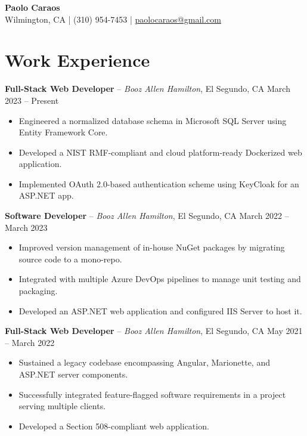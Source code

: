 \documentclass[10pt,letterpaper]{article}
\begin{document}
\begin{center}
    {\Large \bfseries Paolo Caraos} \\ \vspace{2pt}
    {\small Wilmington, CA | (310) 954-7453 | \href{mailto:paolocaraos@gmail.com}{paolocaraos@gmail.com}}
\end{center}


\section{Work Experience}

\noindent
\textbf{Full-Stack Web Developer} -- \textit{Booz Allen Hamilton}, El Segundo, CA \hfill March 2023 -- Present
\begin{itemize}
    \item Engineered a normalized database schema in Microsoft SQL Server using Entity Framework Core.
    \item Developed a NIST RMF-compliant and cloud platform-ready Dockerized web application.
    \item Implemented OAuth 2.0-based authentication scheme using KeyCloak for an ASP.NET app.
\end{itemize}

\vspace{6pt}

\noindent
\textbf{Software Developer} -- \textit{Booz Allen Hamilton}, El Segundo, CA \hfill March 2022 -- March 2023
\begin{itemize}
    \item Improved version management of in-house NuGet packages by migrating source code to a mono-repo.
    \item Integrated with multiple Azure DevOps pipelines to manage unit testing and packaging.
    \item Developed an ASP.NET web application and configured IIS Server to host it.
\end{itemize}

\vspace{6pt}

\noindent
\textbf{Full-Stack Web Developer} -- \textit{Booz Allen Hamilton}, El Segundo, CA \hfill May 2021 -- March 2022
\begin{itemize}
    \item Sustained a legacy codebase encompassing Angular, Marionette, and ASP.NET server components.
    \item Successfully integrated feature-flagged software requirements in a project serving multiple clients.
    \item Developed a Section 508-compliant web application.
\end{itemize}
\end{document}
